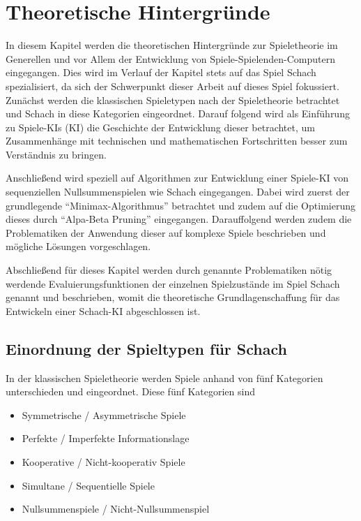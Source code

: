 
\chapter{Theoretische Hintergründe}
\nocite{*}

In diesem Kapitel werden die theoretischen Hintergründe zur Spieletheorie im Generellen und vor Allem der Entwicklung von Spiele-Spielenden-Computern eingegangen. Dies wird im Verlauf der Kapitel stets auf das Spiel Schach spezialisiert, da sich der Schwerpunkt dieser Arbeit auf dieses Spiel fokussiert. 
Zunächst werden die klassischen Spieletypen nach der Spieletheorie betrachtet und Schach in diese Kategorien eingeordnet. Darauf folgend wird als Einführung zu Spiele-\acs{KI}s (\acl{KI}) die Geschichte der Entwicklung dieser betrachtet, um Zusammenhänge mit technischen und mathematischen Fortschritten besser zum Verständnis zu bringen.

Anschließend wird speziell auf Algorithmen zur Entwicklung einer Spiele-KI von sequenziellen Nullsummenspielen wie Schach eingegangen. Dabei wird zuerst der grundlegende ``Minimax-Algorithmus'' betrachtet und zudem auf die Optimierung dieses durch ``Alpa-Beta Pruning'' eingegangen. Darauffolgend werden zudem die Problematiken der Anwendung dieser auf komplexe Spiele beschrieben und mögliche Lösungen vorgeschlagen. 

Abschließend für dieses Kapitel werden durch genannte Problematiken nötig werdende Evaluierungsfunktionen der einzelnen Spielzustände im Spiel Schach genannt und beschrieben, womit die theoretische Grundlagenschaffung für das Entwickeln einer Schach-KI abgeschlossen ist.

\section{Einordnung der Spieltypen für Schach} \label{game_types}

In der klassischen Spieletheorie werden Spiele anhand von fünf Kategorien unterschieden und eingeordnet. Diese fünf Kategorien sind
\begin{itemize}
\item Symmetrische / Asymmetrische Spiele
\item Perfekte / Imperfekte Informationslage
\item Kooperative / Nicht-kooperativ Spiele
\item Simultane / Sequentielle Spiele
\item Nullsummenspiele / Nicht-Nullsummenspiel \cite{Rodriguez}
\end{itemize} 

